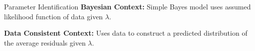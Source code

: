 \begin{block}{Parameter Identification}
\centering
            {\large \textbf{Bayesian Context:} Simple Bayes model uses assumed likelihood function of data given $\lambda$.}
            
            {\large \textbf{Data Consistent Context:} Uses data to construct a predicted distribution of the average residuals given $\lambda$.}
            



\end{block}


